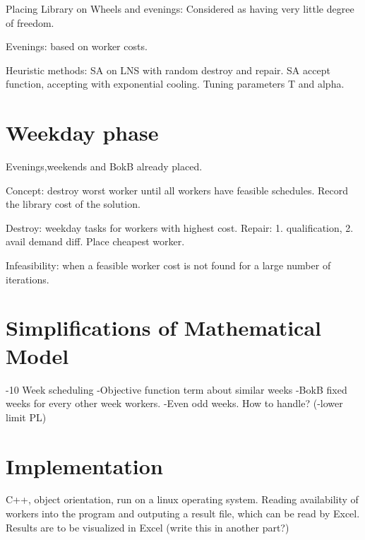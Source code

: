 Placing Library on Wheels and evenings: Considered as having very little degree of freedom. 

Evenings: based on worker costs.

Heuristic methods: SA on LNS with random destroy and repair. SA accept function, accepting with exponential cooling. Tuning parameters T and alpha.

\section{Weekday phase}
Evenings,weekends and BokB already placed. 

Concept: destroy worst worker until all workers have feasible schedules. Record the library cost of the solution. 

Destroy: weekday tasks for workers with highest cost.
Repair: 1. qualification, 2. avail demand diff. Place cheapest worker.

Infeasibility: when a feasible worker cost is not found for a large number of iterations. 

\section{Simplifications of Mathematical Model}
-10 Week scheduling
-Objective function term about similar weeks
-BokB fixed weeks for every other week workers.
-Even odd weeks. How to handle?
(-lower limit PL)

\section{Implementation}
C++, object orientation, run on a linux operating system. Reading availability of workers into the program and outputing a result file, which can be read by Excel. Results are to be visualized in Excel (write this in another part?)
